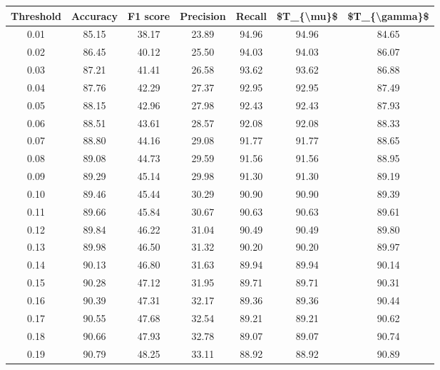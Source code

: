 \begin{tabular}{|c|c|c|c|c|c|c|}
\hline
 Threshold &  Accuracy &  F1 score &  Precision &  Recall &  \$T\_\{\textbackslash mu\}\$ &  \$T\_\{\textbackslash gamma\}\$ \\
\hline
      0.01 &     85.15 &     38.17 &      23.89 &   94.96 &      94.96 &         84.65 \\
      0.02 &     86.45 &     40.12 &      25.50 &   94.03 &      94.03 &         86.07 \\
      0.03 &     87.21 &     41.41 &      26.58 &   93.62 &      93.62 &         86.88 \\
      0.04 &     87.76 &     42.29 &      27.37 &   92.95 &      92.95 &         87.49 \\
      0.05 &     88.15 &     42.96 &      27.98 &   92.43 &      92.43 &         87.93 \\
      0.06 &     88.51 &     43.61 &      28.57 &   92.08 &      92.08 &         88.33 \\
      0.07 &     88.80 &     44.16 &      29.08 &   91.77 &      91.77 &         88.65 \\
      0.08 &     89.08 &     44.73 &      29.59 &   91.56 &      91.56 &         88.95 \\
      0.09 &     89.29 &     45.14 &      29.98 &   91.30 &      91.30 &         89.19 \\
      0.10 &     89.46 &     45.44 &      30.29 &   90.90 &      90.90 &         89.39 \\
      0.11 &     89.66 &     45.84 &      30.67 &   90.63 &      90.63 &         89.61 \\
      0.12 &     89.84 &     46.22 &      31.04 &   90.49 &      90.49 &         89.80 \\
      0.13 &     89.98 &     46.50 &      31.32 &   90.20 &      90.20 &         89.97 \\
      0.14 &     90.13 &     46.80 &      31.63 &   89.94 &      89.94 &         90.14 \\
      0.15 &     90.28 &     47.12 &      31.95 &   89.71 &      89.71 &         90.31 \\
      0.16 &     90.39 &     47.31 &      32.17 &   89.36 &      89.36 &         90.44 \\
      0.17 &     90.55 &     47.68 &      32.54 &   89.21 &      89.21 &         90.62 \\
      0.18 &     90.66 &     47.93 &      32.78 &   89.07 &      89.07 &         90.74 \\
      0.19 &     90.79 &     48.25 &      33.11 &   88.92 &      88.92 &         90.89 \\

\end{tabular}
